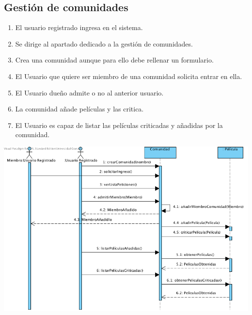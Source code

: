 \documentclass{article}
\begin{document}
	\subsection*{Gestión de comunidades}
	\begin{enumerate}
		\item El usuario registrado ingresa en el sistema.
		\item Se dirige al apartado dedicado a la gestión de comunidades.
		\item Crea una comunidad aunque para ello debe rellenar un formulario.
		\item El Usuario que quiere ser miembro de una comunidad solicita entrar en ella.
		\item El Usuario dueño admite o no al anterior usuario.
		\item La comunidad añade películas y las critica.
		\item El Usuario es capaz de listar las películas criticadas y añadidas por la comunidad.
	\end{enumerate}
		\includegraphics[width=1\linewidth]{./S-Comunidades}
\end{document}
